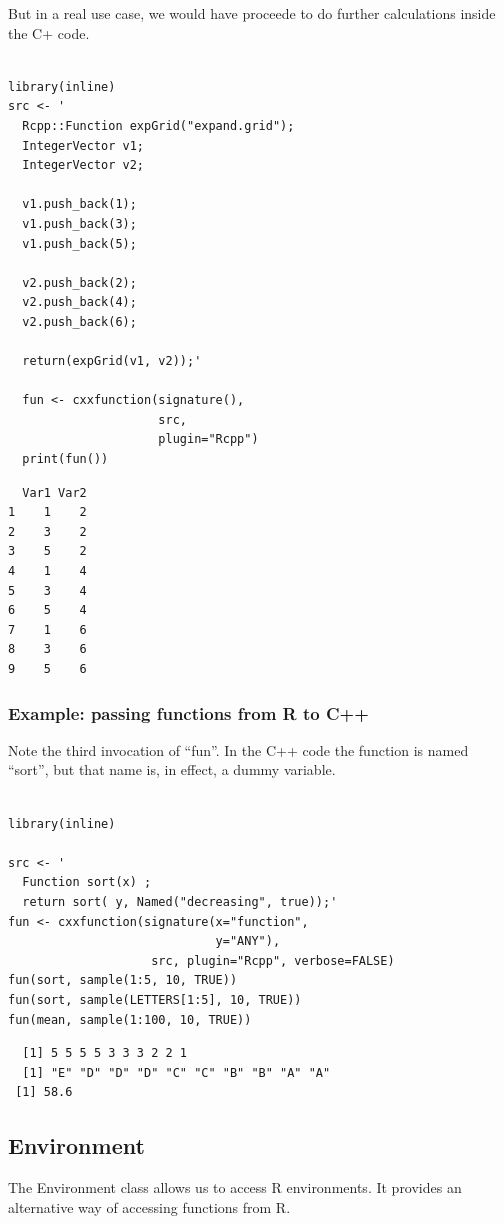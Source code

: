 \documentclass[11pt]{article}
\begin{document}
But in a real use case, we would have proceede to do further
calculations inside the C+ code.


\begin{verbatim}

library(inline)
src <- '
  Rcpp::Function expGrid("expand.grid");
  IntegerVector v1;
  IntegerVector v2;

  v1.push_back(1);
  v1.push_back(3);
  v1.push_back(5);

  v2.push_back(2);
  v2.push_back(4);
  v2.push_back(6);

  return(expGrid(v1, v2));'

  fun <- cxxfunction(signature(),
                     src,
                     plugin="Rcpp")
  print(fun())
\end{verbatim}


\begin{verbatim}
  Var1 Var2
1    1    2
2    3    2
3    5    2
4    1    4
5    3    4
6    5    4
7    1    6
8    3    6
9    5    6
\end{verbatim}
\subsubsection{Example: passing functions from R to C++}
\label{sec-7-3-2}


Note the third invocation of ``fun''.  In the C++ code the function is
named ``sort'', but that name is, in effect, a dummy variable.


\begin{verbatim}

library(inline)

src <- '
  Function sort(x) ;
  return sort( y, Named("decreasing", true));'
fun <- cxxfunction(signature(x="function",
                             y="ANY"),
                    src, plugin="Rcpp", verbose=FALSE)
fun(sort, sample(1:5, 10, TRUE))
fun(sort, sample(LETTERS[1:5], 10, TRUE))
fun(mean, sample(1:100, 10, TRUE))
\end{verbatim}

\begin{verbatim}
  [1] 5 5 5 5 3 3 3 2 2 1
  [1] "E" "D" "D" "D" "C" "C" "B" "B" "A" "A"
 [1] 58.6
\end{verbatim}
\subsection{Environment}
\label{sec-7-4}


The Environment class allows us to access R environments.  It provides
an alternative way of accessing functions from R.
\end{document}
